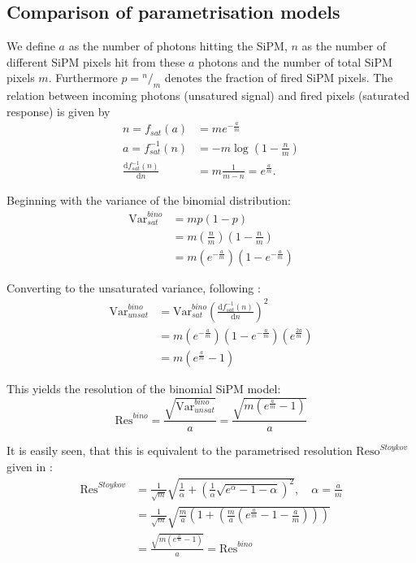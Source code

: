 \documentclass[12pt]{article} %
\begin{document}
\begin{appendices}

\section{Comparison of parametrisation models}
\label{sec:paracomp}
We define $a$ as the number of photons hitting the SiPM, $n$ as the number of different SiPM pixels hit from these $a$ photons and the number of total SiPM pixels $m$. Furthermore $p={}^n/_{m}$ denotes the fraction of fired SiPM pixels.
The relation between incoming photons (unsatured signal) and fired pixels (saturated response) is given by
\begin{align}
	n = f_{sat}(a) &= me^{-\frac{a}{m}} \\
	a = f_{sat}^{-1}(n) &= -m \log\left(1-\frac{n}{m}\right) \\
	\frac{\mathrm{d}{f_{sat}^{-1}(n)}}{\mathrm{d}n} &= m\frac{1}{m-n} = e^\frac{a}{m}.
\end{align}


Beginning with the variance of the binomial distribution:
\begin{align}
	\mathrm{Var}^{bino}_{sat} &= mp(1-p) \\
	&= m \left( \frac{n}{m} \right) \left(1-\frac{n}{m}\right) \nonumber \\
	&= m \left(e^{-\frac{a}{m}}\right)\left(1-e^{-\frac{a}{m}}\right)
\end{align}

Converting to the unsaturated variance, following \cite{PPD}:
\begin{align}
	\mathrm{Var}^{bino}_{unsat} &= \mathrm{Var}^{bino}_{sat}\left(\frac{\mathrm{d}{f_{sat}^{-1}(n)}}{\mathrm{d}n}\right)^2 \\
	&= m \left(e^{-\frac{a}{m}}\right)\left(1-e^{-\frac{a}{m}}\right)\left(e^{\frac{2a}{m}}\right) \nonumber \\
	&= m\left(e^{\frac{a}{m}}-1\right)
\end{align}

This yields the resolution of the binomial SiPM model:
\begin{equation}
	\mathrm{Res}^{bino} = \frac{\sqrt{\mathrm{Var}^{bino}_{unsat}}}{a} = \frac{\sqrt{m\left(e^{\frac{a}{m}}-1\right)}}{a}
\end{equation}

It is easily seen, that this is equivalent to the parametrised resolution $\mathrm{Reso}^{Stoykov}$ given in \cite{PPD}:
\begin{align}
	\mathrm{Res}^{Stoykov} &= \frac{1}{\sqrt{m}}\sqrt{\frac{1}{\alpha}+\left(\frac{1}{\alpha}\sqrt{e^\alpha-1-\alpha}\right)^2},\quad \alpha = \frac{a}{m} \\
	&= \frac{1}{\sqrt{m}}\sqrt{\frac{m}{a}\left(1+\left(\frac{m}{a}\left(e^\frac{a}{m}-1-\frac{a}{m}\right)\right)\right)} \nonumber \\
	&= \frac{\sqrt{m\left(e^\frac{a}{m}-1\right)}}{a} = \mathrm{Res}^{bino}
\end{align}



\end{appendices}
\end{document}

